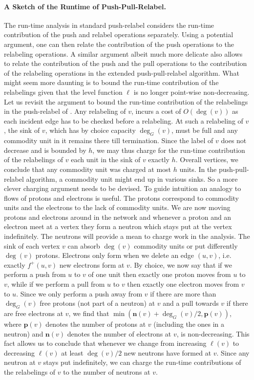 \documentclass[11pt]{article}
\newcommand\bell{\boldsymbol{\mathit{\ell}}}
\newcommand\ff{\boldsymbol{\mathit{f}}}
\begin{document}
\paragraph{A Sketch of the Runtime of Push-Pull-Relabel.} The run-time analysis in standard push-relabel considers the run-time contribution of the push and relabel operations separately. Using a potential argument, one can then relate the contribution of the push operations to the relabeling operations. A similar argument albeit much more delicate also allows to relate the contribution of the push and the pull operations to the contribution of the relabeling operations in the extended push-pull-relabel algorithm. What might seem more daunting is to bound the run-time contribution of the relabelings given that the level function $\bell$ is no longer point-wise non-decreasing. Let us revisit the argument to bound the run-time contribution of the relabelings in the push-relabel of \cite{saranurak2019expander}. Any relabeling of $v$, incurs a cost of $O(\deg(v))$ as each incident edge has to be checked before a relabeling. At such a relabeling of $v$, the sink of $v$, which has by choice capacity $\deg_G(v)$, must be full and any commodity unit in it remains there till termination. Since the label of $v$ does not decrease and is bounded by $h$, we may thus charge for the run-time contribution of the relabelings of $v$ each unit in the sink of $v$ exactly $h$. Overall vertices, we conclude that any commodity unit was charged at most $h$ units. In the push-pull-relabel algorithm, a commodity unit might end up in various sinks. So a more clever charging argument needs to be devised. To guide intuition an analogy to flows of protons and electrons is useful. The protons correspond to commodity units and the electrons to the lack of commodity units. We are now moving protons and electrons around in the network and whenever a proton and an electron meet at a vertex they form a neutron which stays put at the vertex indefinitely. The neutrons will provide a mean to charge work in the analysis. The sink of each vertex $v$ can absorb $\deg(v)$ commodity units or put differently $\deg(v)$ protons. Electrons only form when we delete an edge $(u,v)$, i.e. exactly $\ff^+(u,v)$ new electrons form at $v$. By choice, we now say that if we perform a push from $u$ to $v$ of one unit then exactly one proton moves from $u$ to $v$, while if we perform a pull from $u$ to $v$ then exactly one electron moves from $v$ to $u$. Since we only perform a push away from $v$ if there are more than $\deg_G(v)$ free protons (not part of a neutron) at $v$ and a pull towards $v$ if there are free electrons at $v$, we find that $\min(\textbf{n}(v) + \deg_G(v)/2, \textbf{p}(v))$, where $\textbf{p}(v)$ denotes the number of protons at $v$ (including the ones in a neutron) and $\textbf{n}(v)$ denotes the number of electrons at $v$, is non-decreasing. This fact allows us to conclude that whenever we change from increasing $\bell(v)$ to decreasing $\bell(v)$ at least $\deg(v)/2$ new neutrons have formed at $v$. Since any neutron at $v$ stays put indefinitely, we can charge the run-time contributions of the relabelings of $v$ to the number of neutrons at $v$. 
\end{document}
